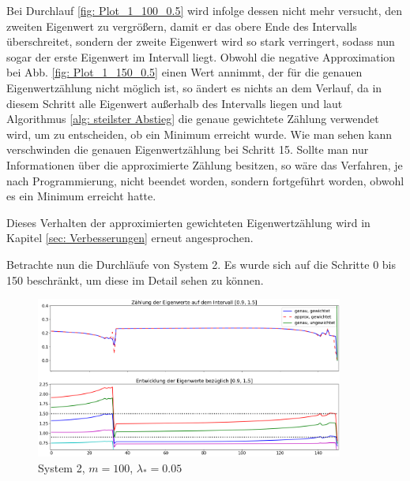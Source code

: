 \documentclass[a4paper,12pt]{report}
\newcommand{\1}{\mathds{1}}
\theoremstyle{plain} %
\theoremstyle{definition} %
\theoremstyle{remark}
\begin{document}
            Bei Durchlauf \ref{fig: Plot_1_100_0.5} wird infolge dessen nicht mehr versucht, den zweiten Eigenwert zu vergrößern,
            damit er das obere Ende des Intervalls überschreitet, sondern der zweite Eigenwert wird so stark verringert, sodass nun sogar der erste Eigenwert im Intervall liegt.
            Obwohl die negative Approximation bei Abb. \ref{fig: Plot_1_150_0.5} einen Wert annimmt, der für die genauen Eigenwertzählung nicht möglich ist, so ändert es nichts an dem Verlauf,
            da in diesem Schritt alle Eigenwert außerhalb des Intervalls liegen und laut Algorithmus \ref{alg: steilster Abstieg}
            die genaue gewichtete Zählung verwendet wird, um zu entscheiden, ob ein Minimum erreicht wurde. Wie man sehen kann verschwinden die genauen Eigenwertzählung bei Schritt 15.
            Sollte man nur Informationen über die approximierte Zählung besitzen, so wäre das Verfahren, je nach Programmierung,
            nicht beendet worden, sondern fortgeführt worden, obwohl es ein Minimum erreicht hatte.

            Dieses Verhalten der approximierten gewichteten Eigenwertzählung wird in Kapitel \ref{sec: Verbesserungen} erneut angesprochen.

            Betrachte nun die Durchläufe von System 2.
            Es wurde sich auf die Schritte 0 bis 150 beschränkt, um diese im Detail sehen zu können.

            \begin{figure}[h!t]
                  \centering
                  \includegraphics[width=0.9\textwidth, keepaspectratio]{./Original/Plot_2_100_0.05.png}
                  \caption{System 2, $m=100$, $\lambda_*=0.05$}
                  \label{fig: Plot_2_100_0.05}
            \end{figure}
\end{document}
